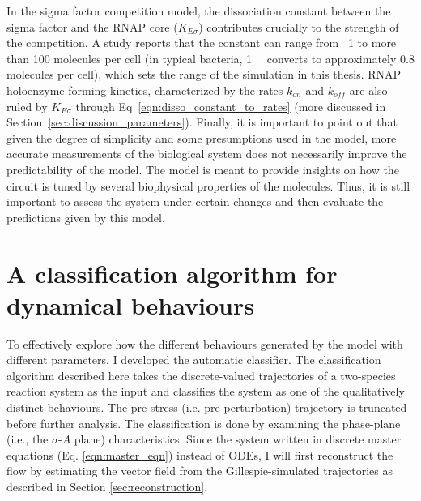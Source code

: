 In the sigma factor competition model, the dissociation constant
between the sigma factor and the RNAP core ($K_{E\sigma}$) contributes crucially
to the strength of the competition.
A study reports that the constant can range from ~1 to more than 100
molecules per cell (in typical bacteria, \SI{1}{\nano\Molar} converts
to approximately 0.8 molecules per cell),
which sets the range of the simulation in this thesis.
RNAP holoenzyme forming kinetics, characterized by the rates
$k_{on}$ and $k_{off}$ are also ruled by $K_{E\sigma}$ through
Eq~\ref{eqn:disso_constant_to_rates} (more discussed in
Section~\ref{sec:discussion_parameters}).
Finally, it is important to point out that given the degree of
simplicity and some presumptions used in the model,
more accurate measurements of the biological system does not
necessarily improve the predictability of the model.
The model is meant to provide insights on how the circuit is 
tuned by several biophysical properties of the molecules.
Thus, it is still important to assess the system under
certain changes and then evaluate the predictions given by this model.


\section{A classification algorithm for dynamical behaviours}
\label{sec:classification_algorithm}

To effectively explore how the different behaviours generated by the model
with different parameters,
I developed the automatic classifier.
The classification algorithm described here takes the 
discrete-valued trajectories of a two-species reaction system as
the input and classifies the system as one of
the qualitatively distinct behaviours.
The pre-stress (i.e. pre-perturbation) trajectory is truncated before further analysis.
The classification is done by examining the phase-plane 
(i.e., the $\sigma$-$A$ plane) characteristics.
Since the system written in discrete master equations (Eq. \ref{eqn:master_eqn})
instead of ODEs, I will first reconstruct the flow by estimating
the vector field from the Gillespie-simulated trajectories as described in
Section \ref{sec:reconstruction}.

